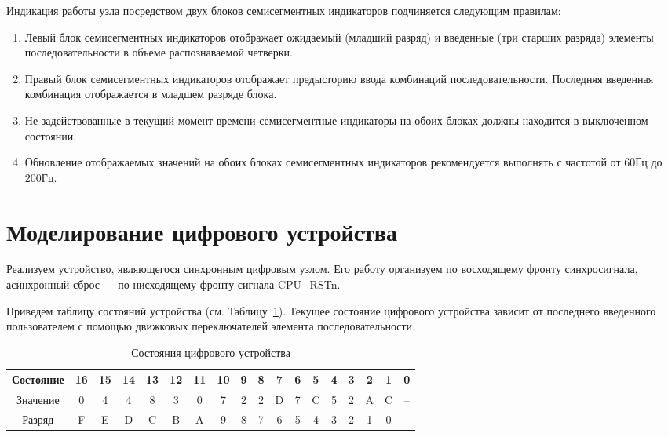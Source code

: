 Индикация работы узла посредством двух блоков семисегментных индикаторов подчиняется следующим правилам:
\begin{enumerate}
	\item Левый блок семисегментных индикаторов отображает ожидаемый (младший
	разряд) и введенные (три старших разряда) элементы последовательности в объеме
	распознаваемой четверки.
	\item  Правый блок семисегментных индикаторов отображает предысторию ввода
	комбинаций последовательности. Последняя введенная комбинация отображается в
	младшем разряде блока.
	\item  Не задействованные в текущий момент времени семисегментные индикаторы на
	обоих блоках должны находится в выключенном состоянии.
	\item Обновление отображаемых значений на обоих блоках семисегментных
	индикаторов рекомендуется выполнять с частотой от 60Гц до 200Гц.
\end{enumerate}


\section{Моделирование цифрового устройства}

Реализуем устройство, являющегося синхронным цифровым узлом. Его работу организуем по восходящему фронту синхросигнала, асинхронный сброс --- по нисходящему фронту сигнала CPU\_RSTn. 

Приведем таблицу состояний устройства (см. Таблицу~\ref{tab:states}). Текущее состояние цифрового устройства зависит от последнего введенного пользователем с помощью движковых переключателей элемента последовательности. 

\begin{table}[h!]
	\centering
	\small
	\caption{Состояния цифрового устройства}
	\begin{tabular}{|c|c|c|c|c|c|c|c|c|c|c|c|c|c|c|c|c|c|}
		\hline
		Состояние & 16& 15&	14	&13	&12&11&	10&	9&	8&	7&	6&	5&	4&	3&	2&	1&	0\\ \hline\hline
		Значение & 0 & 4 & 4 & 8 & 3 & 0 & 7 & 2 & 2 & D & 7 & C & 5 & 2 & A & C&-- \\ \hline\hline
		Разряд & F & E & D & C & B & A & 9 & 8 & 7 & 6 & 5 & 4 & 3 & 2 & 1 & 0 &--\\ \hline
	\end{tabular}
	
	\label{tab:states}
\end{table}

